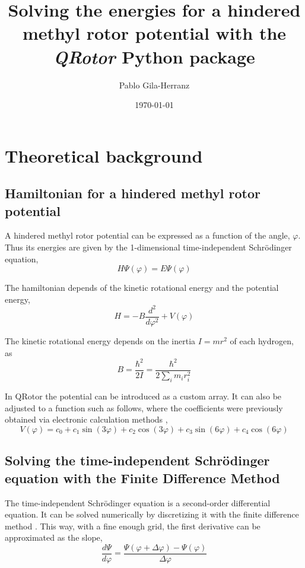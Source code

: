\documentclass[12pt,a4paper]{article}
\title{Solving the energies for a hindered methyl rotor potential with the \textit{QRotor} Python package}
\author{Pablo Gila-Herranz}
\date{\today}
\begin{document}
\maketitle
\tableofcontents
\thispagestyle{empty} %
\newpage
\setcounter{page}{1} %


\section{Theoretical background}


\subsection{Hamiltonian for a hindered methyl rotor potential}


A hindered methyl rotor potential can be expressed as a function of the angle, $\varphi$. Thus its energies are given by the 1-dimensional time-independent Schrödinger equation,
$$
H\Psi(\varphi)=E\Psi(\varphi)
$$

The hamiltonian depends of the kinetic rotational energy and the potential energy,
\begin{equation} \label{hamiltonian}
H = -B \frac{d^2}{d\varphi^2} + V(\varphi)
\end{equation}

The kinetic rotational energy depends on the inertia $I=mr^2$ of each hydrogen, as
\begin{equation} \label{b}
B = \frac{\hbar^2}{2I}=\frac{\hbar^2}{2\sum_{i}m_{i}r_{i}^{2}}
\end{equation}

In QRotor the potential can be introduced as a custom array. It can also be adjusted to a function such as follows, where the coefficients were previously obtained via electronic calculation methods \cite{titov2023},
$$
V(\varphi)=c_{0}+c_{1}\sin(3\varphi)+c_{2}\cos(3\varphi)+c_{3}\sin(6\varphi)+c_{4}\cos(6\varphi)
$$


\subsection{Solving the time-independent Schrödinger equation with the Finite Difference Method}


The time-independent Schrödinger equation is a second-order differential equation.
It can be solved numerically by discretizing it with the finite difference method \cite{finite_diff_python}.
This way, with a fine enough grid, the first derivative can be approximated as the slope,
$$
\frac{d\Psi}{d\varphi} = \frac{\Psi(\varphi+\Delta\varphi)-\Psi(\varphi)}{\Delta\varphi}
$$
\end{document}

